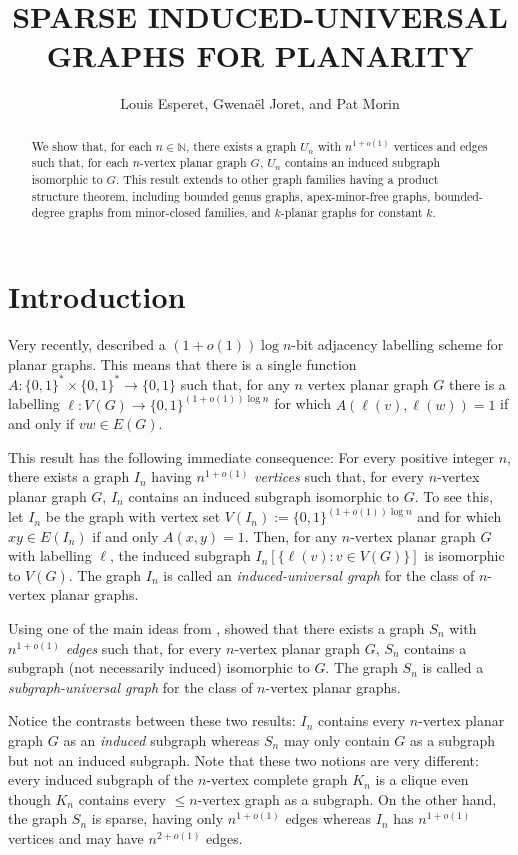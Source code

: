 \documentclass{patmorin}
\title{\MakeUppercase{Sparse Induced-Universal Graphs for Planarity}}
\author{Louis Esperet, Gwenaël Joret, and Pat Morin}
\newcommand{\N}{\mathbb{N}}
\begin{document}
\maketitle

\begin{abstract}
    We show that, for each $n\in\N$, there exists a graph $U_n$ with $n^{1+o(1)}$ vertices and edges such that, for each $n$-vertex planar graph $G$, $U_n$ contains an induced subgraph isomorphic to $G$.  This result extends to other graph families having a product structure theorem, including bounded genus graphs, apex-minor-free graphs, bounded-degree graphs from minor-closed families, and $k$-planar graphs for constant $k$.
\end{abstract}

\section{Introduction}

Very recently, \citet{dujmovic.esperet.ea:adjacency} described a $(1+o(1))\log n$-bit adjacency labelling scheme for planar graphs.  This means that there is a single function $A:\{0,1\}^*\times\{0,1\}^* \to\{0,1\}$ such that, for any $n$ vertex planar graph $G$ there is a labelling $\ell:V(G)\to\{0,1\}^{(1+o(1))\log n}$ for which $A(\ell(v),\ell(w))=1$ if and only if $vw\in E(G)$.

This result has the following immediate consequence: For every positive integer $n$, there exists a graph $I_n$ having $n^{1+o(1)}$ \emph{vertices} such that, for every $n$-vertex planar graph $G$, $I_n$ contains an induced subgraph isomorphic to $G$.  To see this, let $I_n$ be the graph with vertex set $V(I_n):=\{0,1\}^{(1+o(1))\log n}$ and for which $xy\in E(I_n)$ if and only $A(x,y)=1$.  Then, for any $n$-vertex planar graph $G$ with labelling $\ell$, the induced subgraph $I_n[\{\ell(v):v\in V(G)\}]$ is isomorphic to $V(G)$.  The graph $I_n$ is called an \emph{induced-universal graph} for the class of $n$-vertex planar graphs.

Using one of the main ideas from \cite{dujmovic.esperet.ea:adjacency}, \citet{esperet.joret.ea:sparse} showed that there exists a graph $S_n$ with $n^{1+o(1)}$ \emph{edges} such that, for every $n$-vertex planar graph $G$, $S_n$ contains a subgraph (not necessarily induced) isomorphic to $G$.  The graph $S_n$ is called a \emph{subgraph-universal graph} for the class of $n$-vertex planar graphs.

Notice the contrasts between these two results: $I_n$ contains every $n$-vertex planar graph $G$ as an \emph{induced} subgraph whereas $S_n$ may only contain $G$ as a subgraph but not an induced subgraph.  Note that these two notions are very different: every induced subgraph of the $n$-vertex complete graph $K_n$ is a clique even though $K_n$ contains every ${\le\! n}$-vertex graph as a subgraph. On the other hand, the graph $S_n$ is sparse, having only $n^{1+o(1)}$ edges whereas $I_n$ has $n^{1+o(1)}$ vertices and may have $n^{2+o(1)}$ edges.
\end{document}
